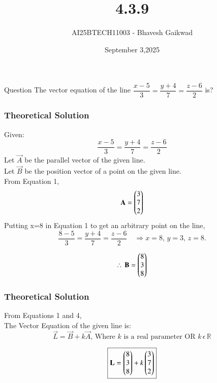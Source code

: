 \documentclass{beamer}
\title
{4.3.9}
\date{September 3,2025}
\author 
{AI25BTECH11003 - Bhavesh Gaikwad}
\begin{document}
\frame{\titlepage}
\begin{frame}{Question}
\centering
The vector equation of the line $\dfrac{x-5}{3} = \dfrac{y+4}{7} = \dfrac{z-6}{2}$ is?
\end{frame}


\begin{frame}[fragile]
    \frametitle{Theoretical Solution}
    Given: 
\begin{equation}
\dfrac{x-5}{3} = \dfrac{y+4}{7} = \dfrac{z-6}{2}
\end{equation}
Let $\vec{A}$ be the parallel vector of the given line.\\
Let $\vec{B}$ be the position vector of a point on the given line.\\

From Equation 1,
\begin{equation}
    \mathbf{A} = \begin{pmatrix}3 \\ 7 \\ 2\end{pmatrix}
\end{equation}
Putting x=8 in Equation 1 to get an arbitrary point on the line,
\begin{equation}
\dfrac{8-5}{3} = \dfrac{y+4}{7} = \dfrac{z-6}{2}
\quad \Rightarrow x=8, \, y = 3, \, z=8.
\end{equation}

\begin{equation}
    \therefore \, \mathbf{B} = \begin{pmatrix}8 \\ 3 \\ 8\end{pmatrix}
\end{equation}

\end{frame}

\begin{frame}[fragile]
\frametitle{Theoretical Solution}
From Equations 1 and 4,\\
The Vector Equation of the given line is: 
\begin{equation}
\vec{L} = \vec{B} + k\vec{A}    
\text{, Where } k \text{ is a real parameter OR } k \, \epsilon \, \mathbb{R}
\end{equation}


\begin{equation}
\boxed{\mathbf{L} =\begin{pmatrix}8 \\ 3 \\ 8\end{pmatrix} +  k\begin{pmatrix}3 \\ 7 \\ 2\end{pmatrix}}
\end{equation}
\end{frame}
\end{document}
